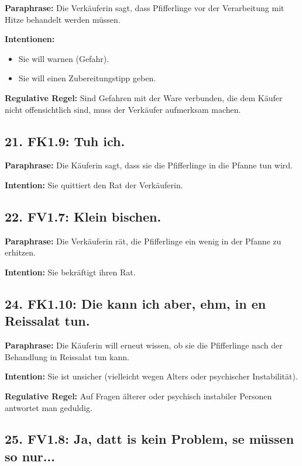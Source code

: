 \documentclass[11pt]{article}
\begin{document}
\textbf{Paraphrase:} Die Verkäuferin sagt, dass Pfifferlinge vor der Verarbeitung mit Hitze behandelt werden müssen.

\textbf{Intentionen:}
\begin{itemize}
    \item Sie will warnen (Gefahr).
    \item Sie will einen Zubereitungstipp geben.
\end{itemize}

\textbf{Regulative Regel:} Sind Gefahren mit der Ware verbunden, die dem Käufer nicht offensichtlich sind, muss der Verkäufer aufmerksam machen.

\subsection*{21. FK1.9: Tuh ich.}

\textbf{Paraphrase:} Die Käuferin sagt, dass sie die Pfifferlinge in die Pfanne tun wird.

\textbf{Intention:} Sie quittiert den Rat der Verkäuferin.

\subsection*{22. FV1.7: Klein bischen.}

\textbf{Paraphrase:} Die Verkäuferin rät, die Pfifferlinge ein wenig in der Pfanne zu erhitzen.

\textbf{Intention:} Sie bekräftigt ihren Rat.

\subsection*{24. FK1.10: Die kann ich aber, ehm, in en Reissalat tun.}

\textbf{Paraphrase:} Die Käuferin will erneut wissen, ob sie die Pfifferlinge nach der Behandlung in Reissalat tun kann.

\textbf{Intention:} Sie ist unsicher (vielleicht wegen Alters oder psychischer Instabilität).

\textbf{Regulative Regel:} Auf Fragen älterer oder psychisch instabiler Personen antwortet man geduldig.

\subsection*{25. FV1.8: Ja, datt is kein Problem, se müssen so nur...}
\end{document}

